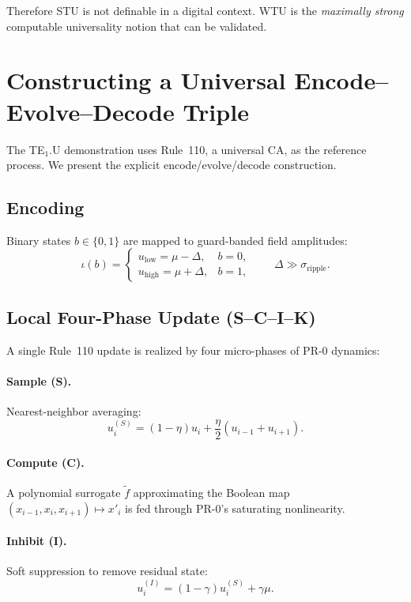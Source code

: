 Therefore STU is not definable in a digital context.
WTU is the \emph{maximally strong} computable universality notion that can be validated.

\section{Constructing a Universal Encode--Evolve--Decode Triple}

The TE$_1$.U demonstration uses Rule~110, a universal CA, as the reference process.
We present the explicit encode/evolve/decode construction.

\subsection{Encoding}
Binary states $b\in\{0,1\}$ are mapped to guard-banded field amplitudes:
\[
\iota(b) =
\begin{cases}
u_{\mathrm{low}} = \mu - \Delta, & b = 0,\\
u_{\mathrm{high}} = \mu + \Delta, & b = 1,
\end{cases}
\qquad \Delta \gg \sigma_{\mathrm{ripple}}.
\]

\subsection{Local Four-Phase Update (S--C--I--K)}

A single Rule~110 update is realized by four micro-phases of PR-0 dynamics:

\paragraph{Sample (S).}
Nearest-neighbor averaging:
\[
u^{(S)}_i = (1-\eta)u_i + \frac{\eta}{2}(u_{i-1}+u_{i+1}).
\]

\paragraph{Compute (C).}
A polynomial surrogate $\tilde{f}$ approximating the Boolean map
$(x_{i-1},x_i,x_{i+1})\mapsto x'_i$ is fed through PR-0's saturating nonlinearity.

\paragraph{Inhibit (I).}
Soft suppression to remove residual state:
\[
u^{(I)}_i = (1-\gamma)u^{(S)}_i + \gamma\mu.
\]

